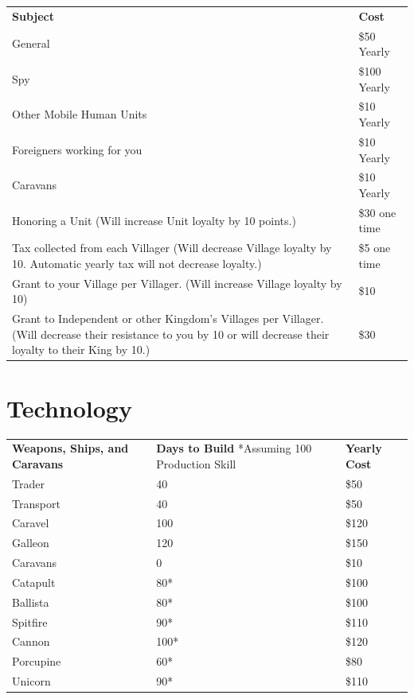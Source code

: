 \begin{tabular}{|p{2in} p{2in}|}
    \hline
    \textbf{Subject} & \textbf{Cost} \\ 
    \rowcolor{gray}General & \$50 Yearly \\ 
    Spy    & \$100 Yearly \\ 
    \rowcolor{gray}Other Mobile Human Units & \$10 Yearly \\ 
    Foreigners working for you & \$10 Yearly \\ 
    \rowcolor{gray}Caravans & \$10 Yearly \\ 
    Honoring a Unit (Will increase Unit loyalty by 10 points.) & \$30 one time \\ 
    \rowcolor{gray}Tax collected from each Villager (Will decrease Village loyalty by 10. Automatic yearly tax will not decrease loyalty.) & \$5 one time \\ 
    Grant to your Village per Villager. (Will increase Village loyalty by 10) & \$10 \\  
    \rowcolor{gray}Grant to Independent or other Kingdom’s Villages per Villager. (Will decrease their resistance to you by 10 or will decrease their loyalty to their King by 10.) & \$30 \\ 
    \hline 
\end{tabular}

\section{Technology}

\begin{tabular}{|p{1.3in} p{1.3in} p{1.3in}|}
    \hline
    \textbf{Weapons, Ships, and Caravans} & \textbf{Days to Build} *Assuming 100 Production Skill & \textbf{Yearly Cost} \\ 
    \rowcolor{gray}Trader & 40 & \$50 \\ 
    Transport & 40 & \$50 \\ 
    \rowcolor{gray}Caravel    & 100 & \$120 \\ 
    Galleon    & 120 & \$150 \\ 
    \rowcolor{gray}Caravans & 0 & \$10 \\ 
    Catapult & 80* & \$100 \\ 
    \rowcolor{gray}Ballista & 80* & \$100 \\ 
    Spitfire & 90* & \$110 \\  
    \rowcolor{gray}Cannon & 100* & \$120 \\  
    Porcupine & 60* & \$80 \\  
    \rowcolor{gray}Unicorn    & 90* & \$110 \\ 
    \hline 
\end{tabular}

